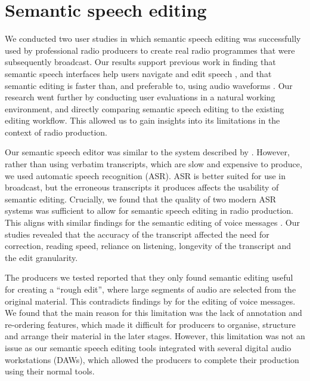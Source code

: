 \section{Semantic speech editing}

We conducted two user studies in which semantic speech editing was successfully used by professional radio producers to
create real radio programmes that were subsequently broadcast. Our results support previous work in finding that
semantic speech interfaces help users navigate and edit speech \citep{Whittaker2002}, and that semantic editing is
faster than, and preferable to, using audio waveforms \citep{Whittaker2004,Sivaraman2016}. Our research went further by
conducting user evaluations in a natural working environment, and directly comparing semantic speech editing to the
existing editing workflow. This allowed us to gain insights into its limitations in the context of radio production.

Our semantic speech editor was similar to the system described by \citet{Rubin2013}. However, rather than using
verbatim transcripts, which are slow and expensive to produce, we used automatic speech recognition (ASR). ASR is
better suited for use in broadcast, but the erroneous transcripts it produces affects the usability of semantic
editing.  Crucially, we found that the quality of two modern ASR systems was sufficient to allow for semantic speech
editing in radio production.  This aligns with similar findings for the semantic editing of voice messages
\citep{Whittaker2004,Sivaraman2016}.  Our studies revealed that the accuracy of the transcript affected the need for
correction, reading speed, reliance on listening, longevity of the transcript and the edit granularity.

The producers we tested reported that they only found semantic editing useful for creating a ``rough edit'', where
large segments of audio are selected from the original material. This contradicts findings by \citet{Sivaraman2016} for
the editing of voice messages.
We found that the main reason for this limitation was the lack of annotation and re-ordering features, which made it
difficult for producers to organise, structure and arrange their material in the later stages.  However, this
limitation was not an issue as our semantic speech editing tools integrated with several digital audio workstations
(DAWs), which allowed the producers to complete their production using their normal tools.

